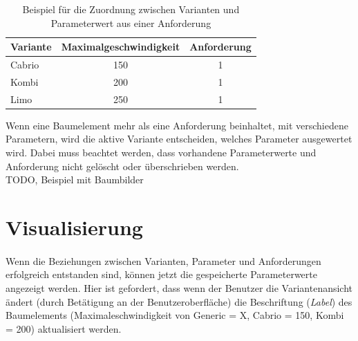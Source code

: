 \begin{table}[h]
\begin{center}
	\begin{tabular}{|l||c|c|}
	 \hline
	 Variante &Maximalgeschwindigkeit &Anforderung\\
	 \hline\hline
	 Cabrio   &150                      & 1\\
	 \hline
	 Kombi    &200                      & 1\\
	 \hline
	 Limo     &250                      & 1\\
	 \hline
	\end{tabular}
	
	\caption{Beispiel für die Zuordnung zwischen Varianten und Parameterwert aus einer Anforderung}
	\label{table:4TestCases}
\end{center}
\end{table}

Wenn eine Baumelement mehr als eine Anforderung beinhaltet, mit verschiedene Parametern, wird die aktive Variante entscheiden, welches Parameter ausgewertet wird. Dabei muss beachtet werden, dass vorhandene Parameterwerte und Anforderung nicht gelöscht oder überschrieben werden.\\

TODO, Beispiel mit Baumbilder


\newpage
\section{Visualisierung}\label{sec.visialisierung}
\paragraph{}


Wenn die Beziehungen zwischen Varianten, Parameter und Anforderungen erfolgreich entstanden sind, können jetzt die gespeicherte Parameterwerte angezeigt werden. Hier ist gefordert, dass wenn der Benutzer die Variantenansicht ändert (durch Betätigung an der Benutzeroberfläche) die Beschriftung (\textit{Label}) des Baumelements (Maximaleschwindigkeit von Generic = X, Cabrio = 150, Kombi = 200) aktualisiert werden.\\



